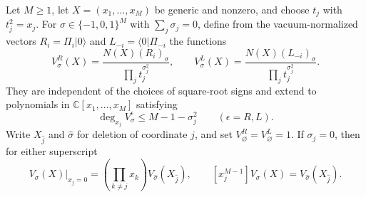 \begin{lemma}\label{j:selected-vacuum-vectors}
Let $M\ge1$, let $X=(x_1,\ldots,x_M)$ be generic and nonzero, and choose
$t_j$ with $t_j^2=x_j$. For
$\sigma\in\{-1,0,1\}^M$ with $\sum_j\sigma_j=0$, define from the
vacuum-normalized vectors $R_i=\Pi_i|0\rangle$ and
$L_{-i}=\langle0|\Pi_{-i}$ the functions
\[
V_\sigma^R(X)=
\frac{N(X)(R_i)_\sigma}{\prod_jt_j^{\sigma_j^2}},
\qquad
V_\sigma^L(X)=
\frac{N(X)(L_{-i})_\sigma}{\prod_jt_j^{\sigma_j^2}}.
\]
They are independent of the choices of square-root signs and extend
to polynomials in $\mathbb C[x_1,\ldots,x_M]$ satisfying
\[
\deg_{x_j}V_\sigma^\epsilon\le M-1-\sigma_j^2
\qquad(\epsilon=R,L).
\]
Write $X_{\widehat j}$ and $\widehat\sigma$ for deletion of coordinate
$j$, and set $V_\varnothing^R=V_\varnothing^L=1$. If $\sigma_j=0$,
then for either superscript
\[
\left.V_\sigma(X)\right|_{x_j=0}
 =\left(\prod_{k\ne j}x_k\right)V_{\widehat\sigma}(X_{\widehat j}),
\qquad
[x_j^{M-1}]V_\sigma(X)=V_{\widehat\sigma}(X_{\widehat j}).
\]
\end{lemma}
